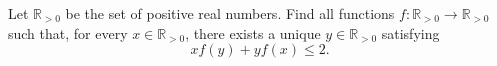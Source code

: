 Let $\mathbb{R}_{>0}$ be the set of positive real numbers. Find all functions $f\colon \mathbb{R}_{>0} \to \mathbb{R}_{>0}$ such that, for every $x \in \mathbb{R}_{>0}$, there exists a unique $y \in \mathbb{R}_{>0}$ satisfying
\[
xf(y) + yf(x) \leq 2.
\]
